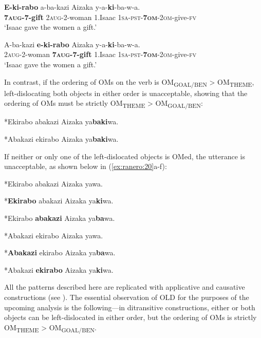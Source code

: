\documentclass[output=paper
,newtxmath
,modfonts
,nonflat]{langsci/langscibook}
\begin{document}
\ea\label{ex:ranero:18}
\ea\label{ex:ranero:18a}
\gll \textbf{E-ki-rabo} a-ba-kazi           Aizaka y-a-\textbf{ki}{}-ba{}-w-a.\\
\textbf{7\textsc{aug}}\textbf{{}-7-gift} 2\textsc{aug}{}-2-woman 1.Isaac \textsc{1sa-pst-}\textbf{\textsc{7om}}\textsc{{}-}\textsc{2om}{}-give-\textsc{fv}\\
\glt ‘Isaac gave the women a gift.’

\ex\label{ex:ranero:18b}
\gll A-ba-kazi          \textbf{e-ki-rabo} Aizaka y-a-\textbf{ki}{}-ba{}-w-a.\\
\textsc{2aug}{}-2-woman \textbf{\textsc{7aug}}\textbf{{}-7-gift} 1.Isaac \textsc{1sa-pst-}\textbf{\textsc{7om}}\textsc{{}-}\textsc{2om}{}-give-\textsc{fv}\\
\glt ‘Isaac gave the women a gift.’
\z
\z

In contrast, if the ordering of OMs on the verb is OM\textsubscript{GOAL/BEN} > OM\textsubscript{THEME}, left-dislocating both objects in either order is unacceptable, showing that the ordering of OMs must be strictly OM\textsubscript{THEME} > OM\textsubscript{GOAL/BEN}:

\ea\label{ex:ranero:19}
\ea\label{ex:ranero:19a}
*Ekirabo abakazi Aizaka ya\textbf{baki}wa.  

\ex\label{ex:ranero:19b}
*Abakazi ekirabo  Aizaka ya\textbf{baki}wa.
\z
\z

If neither or only one of the left-dislocated objects is OMed, the utterance is unacceptable, as shown below in (\ref{ex:ranero:20}a-f):

\ea\label{ex:ranero:20} 
\ea\label{ex:ranero:20a}
*Ekirabo abakazi Aizaka yawa.

\ex\label{ex:ranero:20b}
*\textbf{Ekirabo} abakazi Aizaka ya\textbf{ki}wa.  

\ex\label{ex:ranero:20c}
*Ekirabo \textbf{abakazi} Aizaka ya\textbf{ba}wa.  

\ex\label{ex:ranero:20d}
*Abakazi ekirabo Aizaka yawa.

\ex\label{ex:ranero:20e}
*\textbf{Abakazi} ekirabo Aizaka ya\textbf{ba}wa.

\ex\label{ex:ranero:20f}
*Abakazi \textbf{ekirabo} Aizaka ya\textbf{ki}wa.
\z
\z

All the patterns described here are replicated with applicative and causative constructions (see \citealt{ranero2015}). The essential observation of OLD for the purposes of the upcoming analysis is the following—in ditransitive constructions, either or both objects can be left-dislocated in either order, but the ordering of OMs is strictly OM\textsubscript{THEME} > OM\textsubscript{GOAL/BEN}. 
\end{document}
